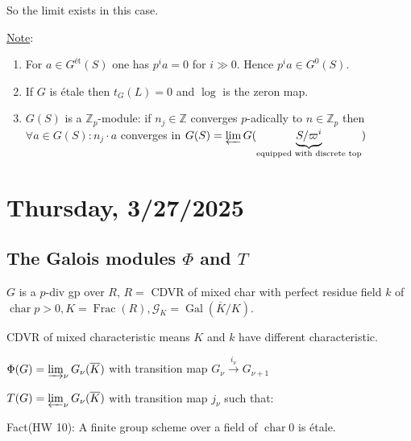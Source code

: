 \documentclass{article}
\theoremstyle{definition}
\numberwithin{theorem}{subsection}
\begin{document}
    So the limit exists in this case.

    \underline{Note}:

    \begin{enumerate}[label=\arabic*)]
        \item  For \(a\in G^{\text{\'et}}(S)\) one has \(p^i a = 0\) for \(i \gg 0\). Hence \(p^i a \in G^0(S)\). 
        \item If \(G\) is \'etale then \(t_G(L) = 0\) and \(\log\) is the zeron map.
        \item \(G(S)\) is a \(\mathbb{Z}_p\)-module: if \(n_j \in \mathbb{Z}\) converges \(p\)-adically to \(n\in \mathbb{Z}_p\) then \(\forall a\in G(S): n_j \cdot a\) converges in \(G(S) = \varprojlim G(\underbrace{S / \varpi^i}_{\text{equipped with discrete top}})\)
    \end{enumerate} 

    \section*{Thursday, 3/27/2025}
    
    \subsection*{The Galois modules \(\Phi\) and \(T\)}

    \(G\) is a \(p\)-div gp over \(R\), \(R=\) CDVR of mixed char with perfect residue field \(k\) of \(\operatorname{char} p > 0, K = \operatorname{Frac}(R), \mathscr{G}_K = \operatorname{Gal}(\overline{K} / K)\).

    CDVR of mixed characteristic means \(K\) and \(k\) have different characteristic.

    \(\Phi(G) = \varinjlim_\nu G_\nu(\overline{K})\) with transition map \(G_\nu \xrightarrow{i_\nu} G_{\nu+1}\)
    
    \(T(G) = \varprojlim_\nu G_\nu(\overline{K})\) with transition map \(j_\nu\) such that:
    
    \begin{center}
    \end{center}

    Fact(HW 10): A finite group scheme over a field of \(\operatorname{char} 0\) is \'etale.
\end{document}
